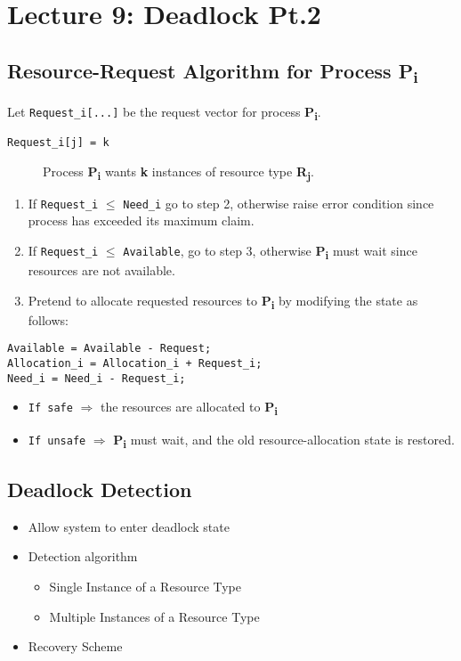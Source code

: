 \documentclass{article}%
\begin{document}
\maketitle
\section{Lecture 9: Deadlock Pt.2}


\subsection{Resource-Request Algorithm for Process P\textsubscript{i}}
\label{sec:org81dc827}
Let \texttt{Request\_i[...]} be the request vector for process \textbf{P\textsubscript{i}}.
\begin{description}
\item[{\texttt{Request\_i[j] = k}}] Process \textbf{P\textsubscript{i}} wants \textbf{k} instances of resource type \textbf{R\textsubscript{j}}.
\end{description}


\begin{enumerate}
\item If \texttt{Request\_i} \(\le\) \texttt{Need\_i} go to step 2, otherwise raise error condition since process has exceeded its maximum claim.
\item If \texttt{Request\_i} \(\le\) \texttt{Available}, go to step 3, otherwise \textbf{P\textsubscript{i}} must wait since resources are not available.
\item Pretend to allocate requested resources to \textbf{P\textsubscript{i}} by modifying the state as follows:
\end{enumerate}

\begin{verbatim}
Available = Available - Request;
Allocation_i = Allocation_i + Request_i;
Need_i = Need_i - Request_i;
\end{verbatim}

\begin{itemize}
\item \texttt{If safe} \(\Rightarrow\) the resources are allocated to \textbf{P\textsubscript{i}}
\item \texttt{If unsafe} \(\Rightarrow\) \textbf{P\textsubscript{i}} must wait, and the old resource-allocation state is restored.
\end{itemize}

\subsection{Deadlock Detection}
\label{sec:org0a58a4c}
\begin{itemize}
\item Allow system to enter deadlock state
\item Detection algorithm
\begin{itemize}
\item Single Instance of a Resource Type
\item Multiple Instances of a Resource Type
\end{itemize}
\item Recovery Scheme
\end{itemize}
\end{document}
